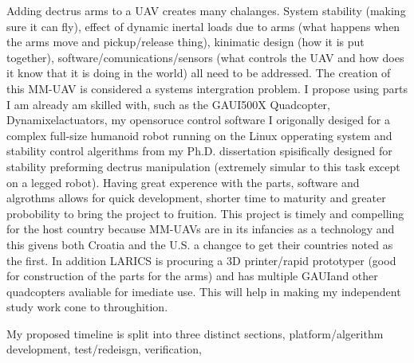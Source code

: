 \documentclass[12pt]{article}
\begin{document}
Adding dectrus arms to a UAV creates many chalanges.  System stability (making sure it can fly), effect of dynamic inertal loads due to arms (what happens when the arms move and pickup/release thing), kinimatic design (how it is put together), software/comunications/sensors (what controls the UAV and how does it know that it is doing in the world) all need to be addressed.  The creation of this MM-UAV is considered a systems intergration problem.  I propose using parts I am already am skilled with, such as the GAUI\texttrademark 500X Quadcopter, Dynamixel\texttrademark actuators, my opensoruce control software I origonally desiged for a complex full-size humanoid robot running on the Linux opperating system and stability control algerithms from my Ph.D. dissertation spisifically designed for stability preforming dectrus manipulation (extremely simular to this task except on a legged robot).  Having great experence with the parts, software and algrothms allows for quick development, shorter time to maturity and greater probobility to bring the project to fruition.  This project is timely and compelling for the host country because MM-UAVs are in its infancies as a technology and this givens both Croatia and the U.S. a changce to get their countries noted as the first.  In addition LARICS is procuring a 3D printer/rapid prototyper (good for construction of the parts for the arms) and has multiple GAUI\texttrademark and other quadcopters avaliable for imediate use.  This will help in making my independent study work cone to throughition.

My proposed timeline is split into three distinct sections, platform/algerithm development, test/redeisgn, verification, 
\end{document}
